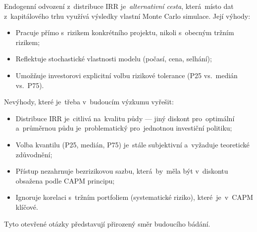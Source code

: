 Endogenní odvození z~distribuce IRR je~\emph{alternativní cesta},
která~místo dat z~kapitálového trhu využívá výsledky vlastní Monte
Carlo simulace. Její výhody:
\begin{itemize}
    \item Pracuje přímo s~rizikem konkrétního projektu, nikoli
          s~obecným tržním rizikem;
    \item Reflektuje stochastické vlastnosti modelu (počasí, cena, selhání);
    \item Umožňuje investorovi explicitní volbu rizikové tolerance
          (P25 vs.~medián vs.~P75).
\end{itemize}
Nevýhody, které je~třeba v~budoucím výzkumu vyřešit:
\begin{itemize}
    \item Distribuce IRR je~citlivá na~kvalitu půdy --- jiný diskont
          pro~optimální a~průměrnou půdu je~problematický pro~jednotnou
          investiční politiku;
    \item Volba kvantilu (P25, medián, P75) je~stále subjektivní
          a~vyžaduje teoretické zdůvodnění;
    \item Přístup nezahrnuje bezrizikovou sazbu, která~by~měla být
          v~diskontu obsažena podle CAPM principu;
    \item Ignoruje korelaci s~tržním portfoliem (systematické riziko),
          které~je~v~CAPM klíčové.
\end{itemize}
Tyto otevřené otázky představují přirozený směr budoucího bádání.